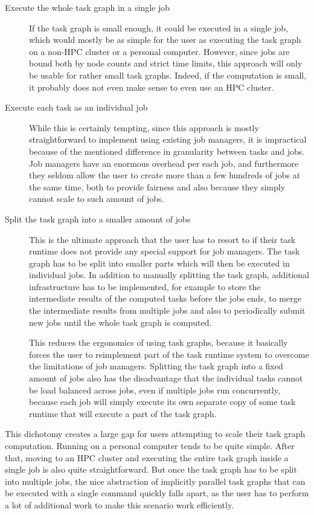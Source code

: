 \begin{description}
    \item[Execute the whole task graph in a single job] If the task graph is small enough, it
    could be executed in a single job, which would mostly be as simple for the user as executing
    the task graph on a non-HPC cluster or a personal computer. However, since jobs are bound
    both by node counts and strict time limits, this approach will only be usable for rather
    small task graphs. Indeed, if the computation is small, it probably does not even make sense
    to even use an HPC cluster.
    \item[Execute each task as an individual job] While this is certainly tempting, since this
    approach is mostly straightforward to implement using existing job managers, it is
    impractical because of the mentioned difference in granularity between tasks and jobs.
    Job managers have an enormous overhead per each job, and furthermore they seldom allow the
    user to create more than a few hundreds of jobs at the same time, both to provide fairness and
    also because they simply cannot scale to such amount of jobs.
    \item[Split the task graph into a smaller amount of jobs] This is the ultimate approach that the
    user has to resort to if their task runtime does not provide any special support for job
    managers. The task graph has to be split into smaller parts which will then be executed in
    individual jobs. In addition to manually splitting the task graph, additional infrastructure
    has to be implemented, for example to store the intermediate results of the computed tasks
    before the jobs ends, to merge the intermediate results from multiple jobs and also to
    periodically submit new jobs until the whole task graph is computed.

    This reduces the ergonomics of using task graphs, because it basically forces the user to
    reimplement part of the task runtime system to overcome the limitations of job managers.
    Splitting the task graph into a fixed amount of jobs also has the disadvantage that the
    individual tasks cannot be load balanced across jobs, even if multiple jobs run
    concurrently, because each job will simply execute its own separate copy of some task
    runtime that will execute a part of the task graph.
\end{description}

This dichotomy creates a large gap for users attempting to scale their task graph
computation. Running on a personal computer tends to be quite simple. After that, moving to an
HPC cluster and executing the entire task graph inside a single job is also quite
straightforward. But once the task graph has to be split into multiple jobs, the nice
abstraction of implicitly parallel task graphs that can be executed with a single command
quickly falls apart, as the user has to perform a lot of additional work to make this scenario
work efficiently.

